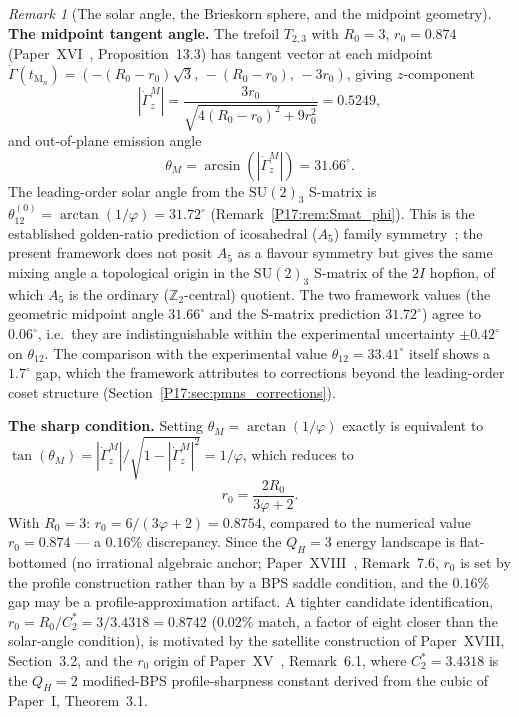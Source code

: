\documentclass[11pt,a4paper]{article}
\theoremstyle{definition}\newtheorem{definition}[theorem]{Definition}
\theoremstyle{remark}
\newtheorem{remark}[theorem]{Remark}
\newcommand{\vp}{\varphi}
\newcommand{\SU}{\mathrm{SU}}
\newcommand{\twoI}{2I}
\newcommand{\QH}{Q_H}
\newcommand{\Ztwo}{\mathbb{Z}_2}
\newcommand{\tang}{\dot\Gamma}
\begin{document}
\begin{remark}[The solar angle, the Brieskorn sphere, and the midpoint geometry]
\textbf{The midpoint tangent angle.}
The trefoil $T_{2,3}$ with $R_0=3$, $r_0=0.874$
(Paper~XVI~\cite{Paper16}, Proposition~13.3) has
tangent vector at each midpoint
$\dot\Gamma(t_{\mathrm{M}_n}) = (-(R_0{-}r_0)\sqrt{3},\,-(R_0{-}r_0),\,-3r_0)$,
giving $z$-component
\begin{equation}
  |\tang_z^M| = \frac{3r_0}{\sqrt{4(R_0-r_0)^2+9r_0^2}} = 0.5249,
  \label{P17:eq:tang_z_M}
\end{equation}
and out-of-plane emission angle
\begin{equation}
  \theta_M = \arcsin(|\tang_z^M|) = 31.66^\circ.
  \label{P17:eq:theta_M}
\end{equation}
The leading-order solar angle from the $\SU(2)_3$ S-matrix is
$\theta_{12}^{(0)}=\arctan(1/\vp)=31.72^\circ$
(Remark~\ref{P17:rem:Smat_phi}).  This is the established golden-ratio
prediction of icosahedral ($A_5$) family symmetry~\cite{Everett2009};
the present framework does not posit $A_5$ as a flavour symmetry but gives
the same mixing angle a topological origin in the $\SU(2)_3$ S-matrix of
the $\twoI$ hopfion, of which $A_5$ is the ordinary ($\Ztwo$-central)
quotient.  The two framework values (the
geometric midpoint angle $31.66^\circ$ and the S-matrix prediction
$31.72^\circ$) agree to $0.06^\circ$, i.e.\ they are
indistinguishable within the experimental uncertainty
$\pm0.42^\circ$ on $\theta_{12}$.  The comparison with the
experimental value $\theta_{12}=33.41^\circ$ itself shows a
$1.7^\circ$ gap, which the framework attributes to corrections
beyond the leading-order coset structure
(Section~\ref{P17:sec:pmns_corrections}).

\textbf{The sharp condition.}
Setting $\theta_M = \arctan(1/\vp)$ exactly is equivalent to
$\tan(\theta_M) = |\tang_z^M|/\sqrt{1-|\tang_z^M|^2} = 1/\vp$,
which reduces to
\begin{equation}
  r_0 = \frac{2R_0}{3\vp+2}.
  \label{P17:eq:r0_phi_condition}
\end{equation}
With $R_0=3$: $r_0=6/(3\vp+2)=0.8754$, compared to the numerical
value $r_0=0.874$ --- a $0.16\%$ discrepancy.  Since the $\QH=3$
energy landscape is flat-bottomed (no irrational algebraic anchor;
Paper~XVIII~\cite{Paper18}, Remark~7.6, %
$r_0$ is set by the profile construction rather than by a BPS saddle
condition, and the $0.16\%$ gap may be a profile-approximation
artifact.  A tighter candidate identification,
$r_0=R_0/C_2^*=3/3.4318=0.8742$ ($0.02\%$ match, a factor of eight
closer than the solar-angle condition), is motivated by the satellite
construction of Paper~XVIII, Section~3.2, %
and the $r_0$ origin of Paper~XV~\cite{Paper15}, Remark~6.1, %
where $C_2^*=3.4318$ is the $\QH=2$ modified-BPS profile-sharpness
constant derived from the cubic of Paper~I, Theorem~3.1.


\end{remark}
\end{document}
